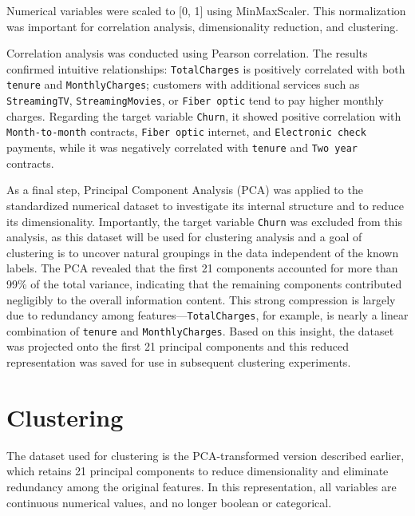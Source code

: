 \documentclass[a4paper,11pt]{article}
\begin{document}
Numerical variables were scaled to [0, 1] using MinMaxScaler. This normalization was important for correlation analysis, dimensionality reduction, and clustering.

Correlation analysis was conducted using Pearson correlation. The results confirmed intuitive relationships: \texttt{TotalCharges} is positively correlated with both \texttt{tenure} and \texttt{MonthlyCharges}; customers with additional services such as \texttt{StreamingTV}, \texttt{StreamingMovies}, or \texttt{Fiber optic} tend to pay higher monthly charges. Regarding the target variable \texttt{Churn}, it showed positive correlation with \texttt{Month-to-month} contracts, \texttt{Fiber optic} internet, and \texttt{Electronic check} payments, while it was negatively correlated with \texttt{tenure} and \texttt{Two year} contracts.

As a final step, Principal Component Analysis (PCA) was applied to the standardized numerical dataset to investigate its internal structure and to reduce its dimensionality. Importantly, the target variable \texttt{Churn} was excluded from this analysis, as this dataset will be used for clustering analysis and a goal of clustering is to uncover natural groupings in the data independent of the known labels. The PCA revealed that the first 21 components accounted for more than 99\% of the total variance, indicating that the remaining components contributed negligibly to the overall information content. This strong compression is largely due to redundancy among features—\texttt{TotalCharges}, for example, is nearly a linear combination of \texttt{tenure} and \texttt{MonthlyCharges}. Based on this insight, the dataset was projected onto the first 21 principal components and this reduced representation was saved for use in subsequent clustering experiments.

\section{Clustering}
The dataset used for clustering is the PCA-transformed version described earlier, which retains 21 principal components to reduce dimensionality and eliminate redundancy among the original features. In this representation, all variables are continuous numerical values, and no longer boolean or categorical.
\end{document}

